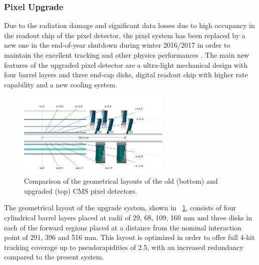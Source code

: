 \subsubsection{Pixel Upgrade}
Due to the radiation damage and significant data losses due to high occupancy in the readout chip of the pixel detector, the pixel system has been replaced by a new one in the end-of-year shutdown during winter 2016/2017 in order to maintain the excellent tracking and other physics performances \cite{New_Pixel_Detector}. The main new features of the upgraded pixel detector are a ultra-light mechanical design with four barrel layers and three end-cap disks, digital readout chip with higher rate capability and a new cooling system.
\begin{figure}[htbp]
\centering
\includegraphics[width=0.65\textwidth]{Images/New_Pixel}
\caption{Comparison of the geometrical layouts of the old (bottom) and upgraded (top) CMS pixel detectors.}
\label{New_Pixel}
\end{figure}
The geometrical layout of the upgrade system, shown in \figurename~\ref{New_Pixel},  consists of four cylindrical barrel layers placed at radii of 29, 68, 109, 160 mm and three disks in each of the forward regions placed at a distance from the nominal interaction point of 291, 396 and 516 mm. This layout is optimized in order to offer full 4-hit tracking coverage up to pseudorapidities of 2.5, with an increased redundancy compared to the present system.

